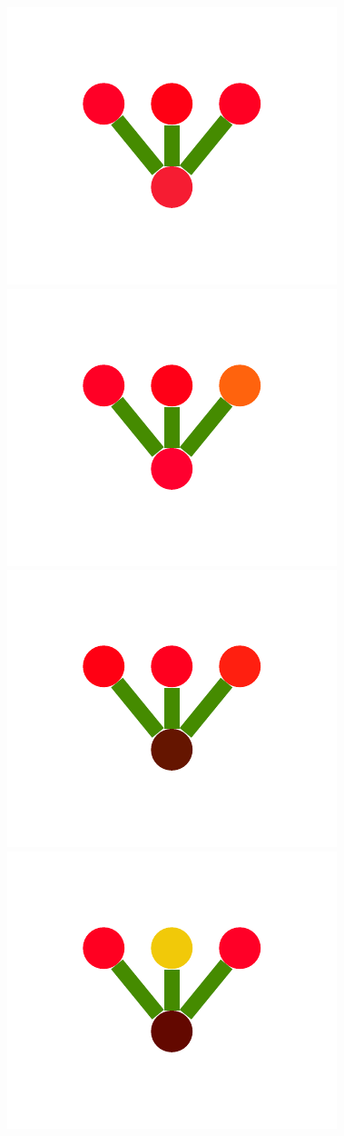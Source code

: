 \documentclass[a4paper,10pt]{article}
\begin{document}
\begin{figure}
{    \includegraphics[scale=.26]{./figures/4-2-1-noisyprog-pre-3.pdf}
    \includegraphics[scale=.26]{./figures/4-2-1-noisyprog-pre-4.pdf}
    \includegraphics[scale=.26]{./figures/4-2-1-noisyprog-pre-5.pdf}
    \includegraphics[scale=.26]{./figures/4-2-1-noisyprog-pre-6.pdf}
}
\end{figure}
\end{document}
